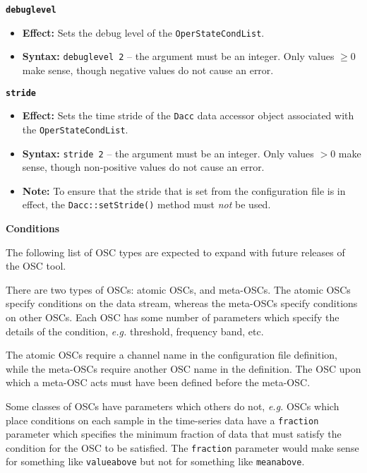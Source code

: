 {{\large\texttt{\textbf{debuglevel}}}
\begin{itemize}
\item \textbf{Effect:} Sets the debug level of the
  \texttt{OperStateCondList}.
\item \textbf{Syntax:} \texttt{debuglevel 2} -- the argument must be an
  integer. Only values $\geq 0$ make sense, though negative values do not
  cause an error.
\end{itemize}

{\large\texttt{\textbf{stride}}}
\begin{itemize}
\item \textbf{Effect:} Sets the time stride of the \texttt{Dacc} data
  accessor object associated with the \texttt{OperStateCondList}.
\item \textbf{Syntax:} \texttt{stride 2} -- the argument must be an
  integer. Only values $\gt 0$ make sense, though non-positive values do
  not cause an error.
\item \textbf{Note:} To ensure that the stride that is set from the
  configuration file is in effect, the \texttt{Dacc::setStride()}
  method must \textit{not} be used.
\end{itemize}

\begin{center}
\textbf{{\large Conditions}}
\end{center}

The following list of OSC types are expected to expand with future
releases of the OSC tool.

There are two types of OSCs: atomic OSCs, and meta-OSCs.  The atomic
OSCs specify conditions on the data stream, whereas the meta-OSCs
specify conditions on other OSCs.  Each OSC has some number of
parameters which specify the details of the condition, \textit{e.g.}
threshold, frequency band, etc.

The atomic OSCs require a channel name in the configuration file
definition, while the meta-OSCs require another OSC name in the
definition.  The OSC upon which a meta-OSC acts must have been defined
before the meta-OSC.

Some classes of OSCs have parameters which others do not, \textit{e.g.}
OSCs which place conditions on each sample in the time-series data
have a \texttt{fraction} parameter which specifies the minimum fraction
of data that must satisfy the condition for the OSC to be satisfied.
The \texttt{fraction} parameter would make sense for something like 
\texttt{valueabove} but not for something like \texttt{meanabove}.

}
